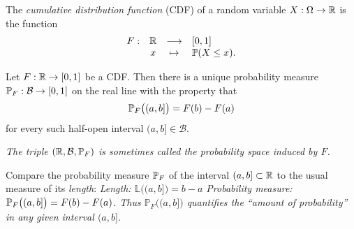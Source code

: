 


\begin{definition}
The \emph{cumulative distribution function} (CDF) of a random variable $X:\Omega\to\mathbb{R}$ is the function
\[
\begin{array}{cccl}
F:	& \mathbb{R}	& \longrightarrow	& [0,1] \\
	& x 			& \mapsto			& \mathbb{P}(X\leq x).
\end{array}
\]
\end{definition}

%
%



\begin{theorem}\label{thm:pmeas_F}
Let $F:\mathbb{R}\to[0,1]$ be a CDF. Then there is a unique probability measure $\mathbb{P}_F:\mathcal{B}\to[0,1]$ on the real line with the property that
\begin{align*}
\mathbb{P}_F\big((a,b]\big) = F(b) - F(a)
\end{align*}
for every such half-open interval $(a,b]\in\mathcal{B}$.
\end{theorem}
\proofomitted

\bit
\it The triple $(\mathbb{R},\mathcal{B},\mathbb{P}_F)$ is sometimes called the \emph{probability space induced by $F$}.
\eit

\begin{remark}
Compare the probability measure $\mathbb{P}_F$ of the interval $(a,b]\subset\mathbb{R}$ to the usual measure of its \emph{length}:
\bit
\it Length: $\mathbb{L}\big((a,b]\big) = b - a$
\it Probability measure:  $\mathbb{P}_F\big((a,b]\big) = F(b)-F(a)$.
\eit
Thus $\mathbb{P}_F\big( (a,b]\big)$ quantifies the ``amount of probability'' in any given interval $(a,b]$.
\end{remark}

